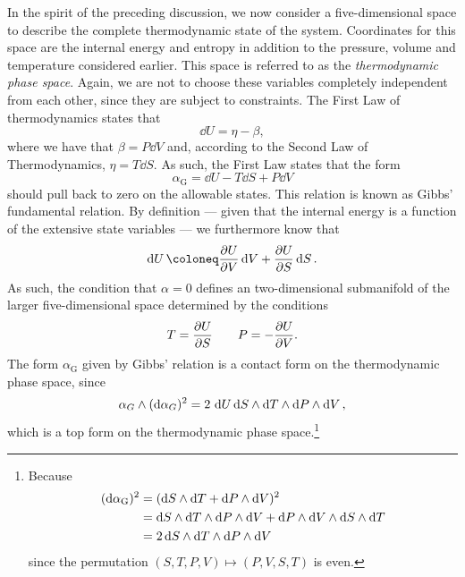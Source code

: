 In the spirit of the preceding discussion, we now consider a five-dimensional space to describe the complete thermodynamic state of the system. Coordinates for this space are the internal energy and entropy in addition to the pressure, volume and temperature considered earlier. This space is referred to as the \emph{thermodynamic phase space}. Again, we are not to choose these variables completely independent from each other, since they are subject to constraints. The First Law of thermodynamics states that
$$ \dd{U} = \eta - \beta, $$
where we have that $ \beta = P\dd{V} $ and, according to the Second Law of Thermodynamics, $\eta = T\dd{S}$. As such, the First Law states that the form
\begin{equation} 
    \alpha_\text{G} = \dd{U} - T\dd{S} + P\dd{V}
    \label{eq:gibbs_relation}
\end{equation}
should pull back to zero on the allowable states. This relation is known as Gibbs' fundamental relation. By definition --- given that the internal energy is a function of the extensive state variables ---  we furthermore know that
$$ \dd{U} \coloneq \pdv{U}{V}\dd{V} + \pdv{U}{S}\dd{S}.$$
As such, the condition that $\alpha = 0$ defines an two-dimensional submanifold of the larger five-dimensional space determined by the conditions
\begin{equation}
    T = \pdv{U}{S} \qquad P = -\pdv{U}{V}. 
\end{equation}
The form $\alpha_\text{G}$ given by Gibbs' relation is a contact form on the thermodynamic phase space, since
$$  \alpha_G\wedge(\dd{\alpha_G})^2  = 2\,\dd{U}  \dd{S}\wedge\dd{T} \wedge \dd{P}\wedge\dd{V}  , $$
which is a top form on the thermodynamic phase space.\footnote
{
    Because 
    \begin{equation*} 
        \begin{split}
            (\dd{\alpha_\text{G}})^2 &= ( \dd{S}\wedge\dd{T}  +  \dd{P}\wedge\dd{V} )^2 \\
                            &=   \dd{S}\wedge\dd{T} \wedge \dd{P}\wedge\dd{V}   +   \dd{P}\wedge\dd{V} \wedge \dd{S}\wedge\dd{T}   \\
                            &= 2  \dd{S}\wedge\dd{T} \wedge \dd{P}\wedge\dd{V}   \\
        \end{split}
    \end{equation*}
    since the permutation $ (S, T, P, V) \mapsto (P, V, S, T) $ is even.
}

